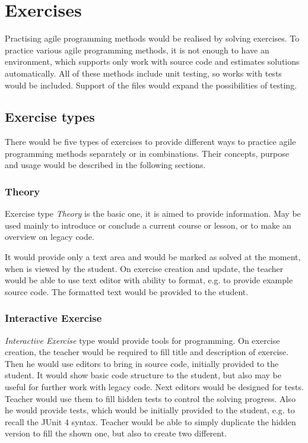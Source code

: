 \section{Exercises}
\label{sec:exercises}
Practising agile programming methods would be realised by solving exercises. To practice various agile programming methods, it is not enough to have an environment, which supports only work with source code and estimates solutions automatically. All of these methods include unit testing, so works with tests would be included. Support of the files would expand the possibilities of testing.


    \subsection{Exercise types}
    \label{subsec:exercise-types}
    There would be five types of exercises to provide different ways to practice agile programming methods separately or in combinations. Their concepts, purpose and usage would be described in the following sections.
        
        
        \subsubsection{Theory}
        Exercise type \textit{Theory} is the basic one, it is aimed to provide information. May be used mainly to introduce or conclude a current course or lesson, or to make an overview on legacy code.
        
        It would provide only a text area and would be marked as solved at the moment, when is viewed by the student. On exercise creation and update, the teacher would be able to use text editor with ability to format, e.g. to provide example source code. The formatted text would be provided to the student.
    
    
        \subsubsection{Interactive Exercise}
        \label{subsubsec:whitebox}
        \textit{Interactive Exercise} type would provide tools for programming.
        On exercise creation, the teacher would be required to fill title and description of exercise. Then he would use editors to bring in source code, initially provided to the student. It would show basic code structure to the student, but also may be useful for further work with legacy code. Next editors would be designed for tests. Teacher would use them to fill hidden tests to control the solving progress. Also he would provide tests, which would be initially provided to the student, e.g. to recall the JUnit 4 syntax. Teacher would be able to simply duplicate the hidden version to fill the shown one, but also to create two different.
        

